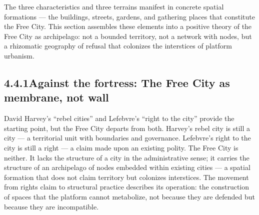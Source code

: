 The three characteristics and three terrains manifest in concrete spatial formations — the buildings, streets, gardens, and gathering places that constitute the Free City. This section assembles these elements into a positive theory of the Free City as archipelago: not a bounded territory, not a network with nodes, but a rhizomatic geography of refusal that colonizes the interstices of platform urbanism.

\subsection{4.4.1\quad Against the fortress: The Free City as membrane, not wall}

David Harvey’s “rebel cities” and Lefebvre’s “right to the city” provide the starting point, but the Free City departs from both. Harvey’s rebel city is still a city — a territorial unit with boundaries and governance. Lefebvre’s right to the city is still a right — a claim made upon an existing polity. The Free City is neither. It lacks the structure of a city in the administrative sense; it carries the structure of an archipelago of nodes embedded within existing cities — a spatial formation that does not claim territory but colonizes interstices. The movement from rights claim to structural practice describes its operation: the construction of spaces that the platform cannot metabolize, not because they are defended but because they are incompatible.

